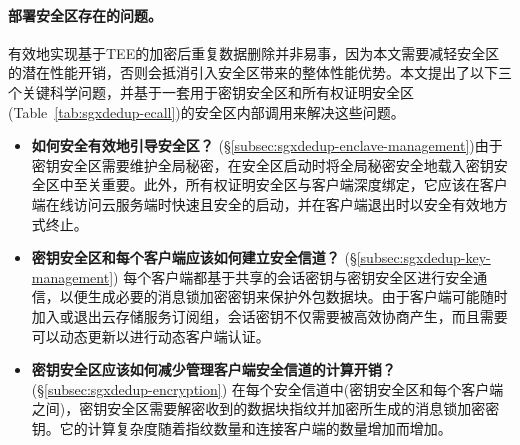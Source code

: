 \paragraph*{部署安全区存在的问题。}有效地实现基于TEE的加密后重复数据删除并非易事，因为本文需要减轻安全区的潜在性能开销，否则会抵消引入安全区带来的整体性能优势。本文提出了以下三个关键科学问题，并基于一套用于密钥安全区和所有权证明安全区(Table~\ref{tab:sgxdedup-ecall})的安全区内部调用来解决这些问题。

\begin{itemize}[leftmargin=0em]
    \item \textbf{如何安全有效地引导安全区？} (\S\ref{subsec:sgxdedup-enclave-management})由于密钥安全区需要维护全局秘密，在安全区启动时将全局秘密安全地载入密钥安全区中至关重要。此外，所有权证明安全区与客户端深度绑定，它应该在客户端在线访问云服务端时快速且安全的启动，并在客户端退出时以安全有效地方式终止。
    \item \textbf{密钥安全区和每个客户端应该如何建立安全信道？} (\S\ref{subsec:sgxdedup-key-management})
          每个客户端都基于共享的会话密钥与密钥安全区进行安全通信，以便生成必要的消息锁加密密钥来保护外包数据块。由于客户端可能随时加入或退出云存储服务订阅组，会话密钥不仅需要被高效协商产生，而且需要可以动态更新以进行动态客户端认证。
    \item \textbf{密钥安全区应该如何减少管理客户端安全信道的计算开销？} (\S\ref{subsec:sgxdedup-encryption})
          在每个安全信道中(密钥安全区和每个客户端之间)，密钥安全区需要解密收到的数据块指纹并加密所生成的消息锁加密密钥。它的计算复杂度随着指纹数量和连接客户端的数量增加而增加。
\end{itemize}
